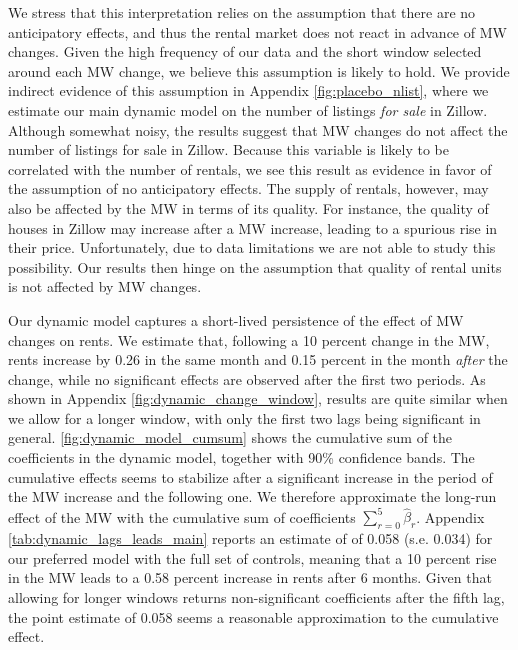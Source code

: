We stress that this interpretation relies on the assumption that there are no anticipatory
effects, and thus the rental market does not react in advance of MW changes. Given the high 
frequency of our data and the short window selected around each MW change, we believe this 
assumption is likely to hold. We provide indirect evidence of this assumption in Appendix 
\autoref{fig:placebo_nlist}, where we estimate our main dynamic model on the number of listings 
\textit{for sale} in Zillow. Although somewhat noisy, the results suggest that MW changes do 
not affect the number of listings for sale in Zillow. Because this variable is likely to be 
correlated with the number of rentals, we see this result as evidence in favor of the 
assumption of no anticipatory effects. The supply of rentals, however, may also be affected 
by the MW in terms of its quality. For instance, the quality of houses in Zillow may increase 
after a MW increase, leading to a spurious rise in their price. Unfortunately, due to data 
limitations we are not able to study this possibility. Our results then hinge on the assumption 
that quality of rental units is not affected by MW changes.

Our dynamic model captures a short-lived persistence of the effect of MW changes on rents. We 
estimate that, following a 10 percent change in the MW, rents increase by 0.26 in the same month 
and 0.15 percent in the month \textit{after} the change, while no significant effects are 
observed after the first two periods. As shown in Appendix \autoref{fig:dynamic_change_window}, 
results are quite similar when we allow for a longer window, with only the first two lags being 
significant in general.
\autoref{fig:dynamic_model_cumsum} shows the cumulative sum of the coefficients in the dynamic 
model, together with 90\% confidence bands. The cumulative effects seems to stabilize after a 
significant increase in the period of the MW increase and the following one. We therefore 
approximate the long-run effect of the MW with the cumulative sum of coefficients 
$\sum_{r=0}^{5} \hat{\beta}_{r}$. Appendix \autoref{tab:dynamic_lags_leads_main} reports an 
estimate of of 0.058 (s.e. 0.034) for our preferred model with the full set of controls, 
meaning that a 10 percent rise in the MW leads to a 0.58 percent increase in rents after 6 
months. Given that allowing for longer windows returns non-significant coefficients after the 
fifth lag, the point estimate of 0.058 seems a reasonable approximation to the cumulative effect.

